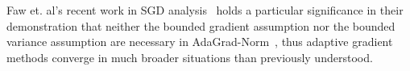 \documentclass{article}
\begin{document}
Faw et. al's recent work in SGD analysis~\cite{https://doi.org/10.48550/arxiv.2202.05791} holds a particular significance in their demonstration that
neither the bounded gradient assumption nor the bounded variance assumption are necessary in AdaGrad-Norm~\cite{ward2018adagrad},
thus adaptive gradient methods converge in much broader situations than previously understood.

\medskip
\small


%
\end{document}

